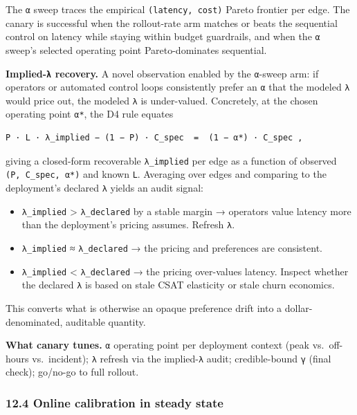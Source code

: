 \documentclass[
  11pt,
]{article}
\providecommand{\tightlist}{%
  \setlength{\itemsep}{0pt}\setlength{\parskip}{0pt}}
\begin{document}
The \texttt{α} sweep traces the empirical \texttt{(latency,\ cost)}
Pareto frontier per edge. The canary is successful when the rollout-rate
arm matches or beats the sequential control on latency while staying
within budget guardrails, and when the \texttt{α} sweep's selected
operating point Pareto-dominates sequential.

\textbf{Implied-\texttt{λ} recovery.} A novel observation enabled by the
\texttt{α}-sweep arm: if operators or automated control loops
consistently prefer an \texttt{α} that the modeled \texttt{λ} would
price out, the modeled \texttt{λ} is under-valued. Concretely, at the
chosen operating point \texttt{α*}, the D4 rule equates

\begin{verbatim}
P · L · λ_implied − (1 − P) · C_spec  =  (1 − α*) · C_spec ,
\end{verbatim}

giving a closed-form recoverable \texttt{λ\_implied} per edge as a
function of observed \texttt{(P,\ C\_spec,\ α*)} and known \texttt{L}.
Averaging over edges and comparing to the deployment's declared
\texttt{λ} yields an audit signal:

\begin{itemize}
\tightlist
\item
  \texttt{λ\_implied} \textgreater{} \texttt{λ\_declared} by a stable
  margin → operators value latency more than the deployment's pricing
  assumes. Refresh \texttt{λ}.
\item
  \texttt{λ\_implied} ≈ \texttt{λ\_declared} → the pricing and
  preferences are consistent.
\item
  \texttt{λ\_implied} \textless{} \texttt{λ\_declared} → the pricing
  over-values latency. Inspect whether the declared \texttt{λ} is based
  on stale CSAT elasticity or stale churn economics.
\end{itemize}

This converts what is otherwise an opaque preference drift into a
dollar-denominated, auditable quantity.

\textbf{What canary tunes.} \texttt{α} operating point per deployment
context (peak vs.~off-hours vs.~incident); \texttt{λ} refresh via the
implied-\texttt{λ} audit; credible-bound \texttt{γ} (final check);
go/no-go to full rollout.

\subsubsection{12.4 Online calibration in steady
state}\label{online-calibration-in-steady-state}
\end{document}
